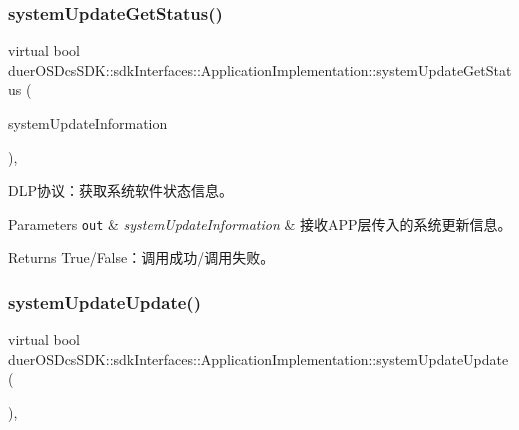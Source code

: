 \subsubsection{\texorpdfstring{system\+Update\+Get\+Status()}{systemUpdateGetStatus()}}
{\footnotesize\ttfamily virtual bool duer\+O\+S\+Dcs\+S\+D\+K\+::sdk\+Interfaces\+::\+Application\+Implementation\+::system\+Update\+Get\+Status (\begin{DoxyParamCaption}\item[{\hyperlink{structduerOSDcsSDK_1_1sdkInterfaces_1_1SystemUpdateInformation}{System\+Update\+Information} \&}]{system\+Update\+Information }\end{DoxyParamCaption})\hspace{0.3cm}{\ttfamily [inline]}, {\ttfamily [virtual]}}



D\+L\+P协议：获取系统软件状态信息。 


\begin{DoxyParams}[1]{Parameters}
\mbox{\tt out}  & {\em system\+Update\+Information} & 接收\+A\+P\+P层传入的系统更新信息。 \\
\hline
\end{DoxyParams}
\begin{DoxyReturn}{Returns}
True/\+False：调用成功/调用失败。 
\end{DoxyReturn}
\mbox{\label{classduerOSDcsSDK_1_1sdkInterfaces_1_1ApplicationImplementation_a644e2bfddb8d4a38fadc0acde7d568ac}} 
\subsubsection{\texorpdfstring{system\+Update\+Update()}{systemUpdateUpdate()}}
{\footnotesize\ttfamily virtual bool duer\+O\+S\+Dcs\+S\+D\+K\+::sdk\+Interfaces\+::\+Application\+Implementation\+::system\+Update\+Update (\begin{DoxyParamCaption}{ }\end{DoxyParamCaption})\hspace{0.3cm}{\ttfamily [inline]}, {\ttfamily [virtual]}}



